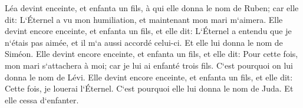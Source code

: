 \verse Léa devint enceinte, et enfanta un fils, à qui elle donna le nom de Ruben; car elle dit: L`Éternel a vu mon humiliation, et maintenant mon mari m`aimera. 
\verse Elle devint encore enceinte, et enfanta un fils, et elle dit: L`Éternel a entendu que je n`étais pas aimée, et il m`a aussi accordé celui-ci. Et elle lui donna le nom de Siméon. 
\verse Elle devint encore enceinte, et enfanta un fils, et elle dit: Pour cette fois, mon mari s`attachera à moi; car je lui ai enfanté trois fils. C`est pourquoi on lui donna le nom de Lévi. 
\verse Elle devint encore enceinte, et enfanta un fils, et elle dit: Cette fois, je louerai l`Éternel. C`est pourquoi elle lui donna le nom de Juda. Et elle cessa d`enfanter. 

